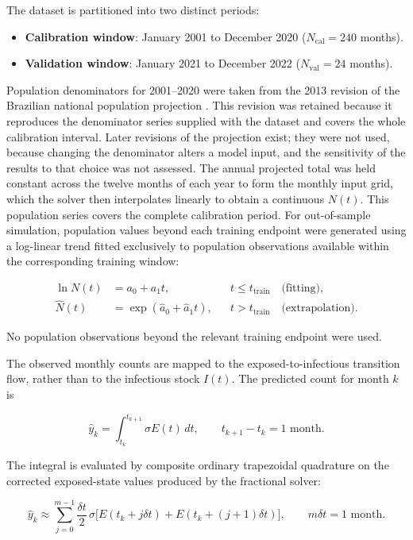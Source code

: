 \documentclass[pdflatex,sn-mathphys-ay]{sn-jnl}
\begin{document}
The dataset is partitioned into two distinct periods:

\begin{itemize}
\item \textbf{Calibration window}: January 2001 to December 2020 ($N_{\text{cal}} = 240$ months).
\item \textbf{Validation window}: January 2021 to December 2022 ($N_{\text{val}} = 24$ months).
\end{itemize}

Population denominators for 2001--2020 were taken from the 2013 revision of the Brazilian national population projection \citep{ibge2013}. This revision was retained because it reproduces the denominator series supplied with the dataset and covers the whole calibration interval. Later revisions of the projection exist; they were not used, because changing the denominator alters a model input, and the sensitivity of the results to that choice was not assessed. The annual projected total was held constant across the twelve months of each year to form the monthly input grid, which the solver then interpolates linearly to obtain a continuous $N(t)$. This population series covers the complete calibration period. For out-of-sample simulation, population values beyond each training endpoint were generated using a log-linear trend fitted exclusively to population observations available within the corresponding training window:

\[
\begin{aligned}
\ln N(t)&=a_0+a_1t, &&t\le t_{\mathrm{train}}\quad\text{(fitting)},\\
\widehat N(t)&=\exp(\widehat a_0+\widehat a_1t), &&t>t_{\mathrm{train}}\quad\text{(extrapolation)}.
\end{aligned}
\]

No population observations beyond the relevant training endpoint were used.

The observed monthly counts are mapped to the exposed-to-infectious transition flow, rather than to the infectious stock $I(t)$. The predicted count for month $k$ is

\[
\widehat y_k=\int_{t_k}^{t_{k+1}}\sigma E(t)\,dt,\qquad t_{k+1}-t_k=1\text{ month}.
\]

The integral is evaluated by composite ordinary trapezoidal quadrature on the corrected exposed-state values produced by the fractional solver:

\[
\widehat y_k\approx\sum_{j=0}^{m-1}\frac{\delta t}{2}\,\sigma\bigl[E(t_k+j\delta t)+E(t_k+(j+1)\delta t)\bigr],\qquad m\delta t=1\text{ month}.
\]
\end{document}
